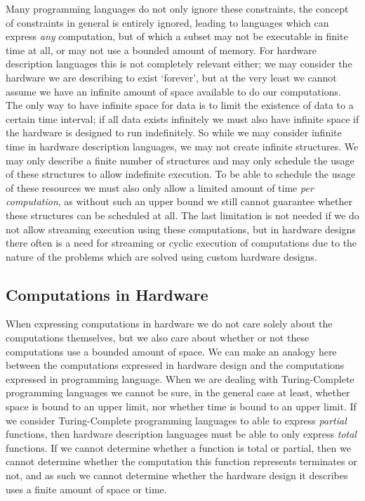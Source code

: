 Many programming languages do not only ignore these constraints, the concept of constraints in general is entirely ignored, leading to languages which can express \textit{any} computation, but of which a subset may not be executable in finite time at all, or may not use a bounded amount of memory.
For hardware description languages this is not completely relevant either; we may consider the hardware we are describing to exist `forever', but at the very least we cannot assume we have an infinite amount of space available to do our computations.
The only way to have infinite space for data is to limit the existence of data to a certain time interval; if all data exists infinitely we must also have infinite space if the hardware is designed to run indefinitely.
So while we may consider infinite time in hardware description languages, we may not create infinite structures. 
We may only describe a finite number of structures and may only schedule the usage of these structures to allow indefinite execution.
To be able to schedule the usage of these resources we must also only allow a limited amount of time \textit{per computation}, as without such an upper bound we still cannot guarantee whether these structures can be scheduled at all.
The last limitation is not needed if we do not allow streaming execution using these computations, but in hardware designs there often is a need for streaming or cyclic execution of computations due to the nature of the problems which are solved using custom hardware designs.

\subsection{Computations in Hardware}
When expressing computations in hardware we do not care solely about the computations themselves, but we also care about whether or not these computations use a bounded amount of space.
We can make an analogy here between the computations expressed in hardware design and the computations expressed in programming language.
When we are dealing with Turing-Complete programming languages we cannot be sure, in the general case at least, whether space is bound to an upper limit, nor whether time is bound to an upper limit.
If we consider Turing-Complete programming languages to able to express \textit{partial} functions, then hardware description languages must be able to only express \textit{total} functions. 
If we cannot determine whether a function is total or partial, then we cannot determine whether the computation this function represents terminates or not, and as such we cannot determine whether the hardware design it describes uses a finite amount of space or time.


